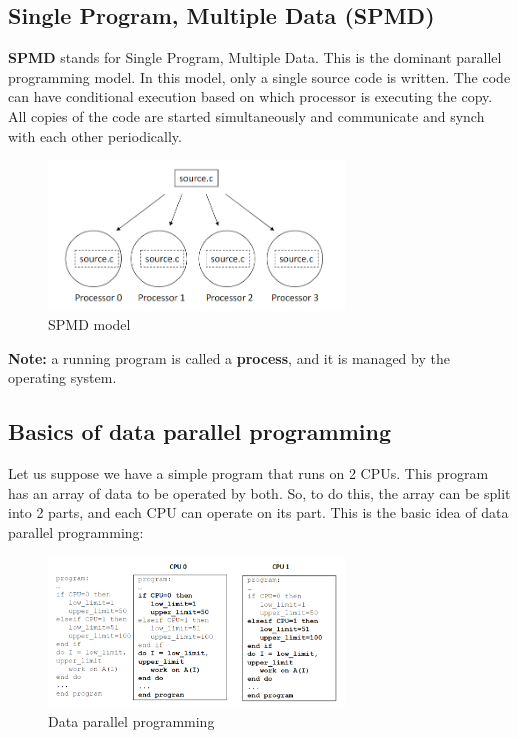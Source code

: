 \subsection{Single Program, Multiple Data (SPMD)}

\textbf{SPMD} stands for Single Program, Multiple Data. This is the dominant parallel
programming model. In this model, only a single source code is written. The code can have
conditional execution based on which processor is executing the copy. All copies of 
the code are started simultaneously and communicate and synch with each other periodically.

\begin{figure}[H]
    \centering
    \includegraphics[width=0.7\textwidth]{figures/spmd.png}
    \caption{SPMD model}
    \label{fig:spmd}
\end{figure}

\textbf{Note:} a running program is called a \textbf{process}, and it is managed by the
operating system. 

\subsection{Basics of data parallel programming}

Let us suppose we have a simple program that runs on 2 CPUs. This program has an array
of data to be operated by both. So, to do this, the array can be split into 2 parts, and
each CPU can operate on its part. This is the basic idea of data parallel programming:

\begin{figure}[H]
    \centering
    \includegraphics[width=0.7\textwidth]{figures/data_parallel.png}
    \caption{Data parallel programming}
    \label{fig:data_parallel}
\end{figure}

